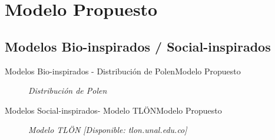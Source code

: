 \section{Modelo Propuesto}
\subsection{Modelos Bio-inspirados / Social-inspirados}
\begin{frame}{Modelos Bio-inspirados - Distribución de Polen}{Modelo Propuesto}
    \begin{figure}				
		\caption{\small \sl Distribución de Polen \cite{pollen}}
		\label{figure:Pollen}
    \end{figure}
\end{frame}
\begin{frame}{Modelos Social-inspirados- Modelo TLÖN}{Modelo Propuesto}
    \begin{figure}				
		\caption{\small \sl Modelo TLÖN [Disponible: tlon.unal.edu.co]}
		\label{figure:TLON}
    \end{figure}
\end{frame}
